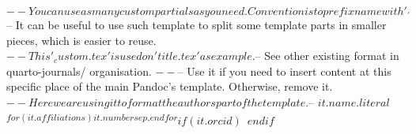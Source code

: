$-- You can use as many custom partials as you need. Convention is to prefix name with '_'
$-- It can be useful to use such template to split some template parts in smaller pieces, which is easier to reuse. 
$-- This '_custom.tex' is used on 'title.tex' as example.
$-- See other existing format in quarto-journals/ organisation.
$-- %
$-- Use it if you need to insert content at this specific place of the main Pandoc's template. Otherwise, remove it.
$-- Here we are using it to format the authors part of the template.
$-- %
$it.name.literal$\textsuperscript{$for(it.affiliations)$$it.number$$sep$,$endfor$}$if(it.orcid)$~$endif$
